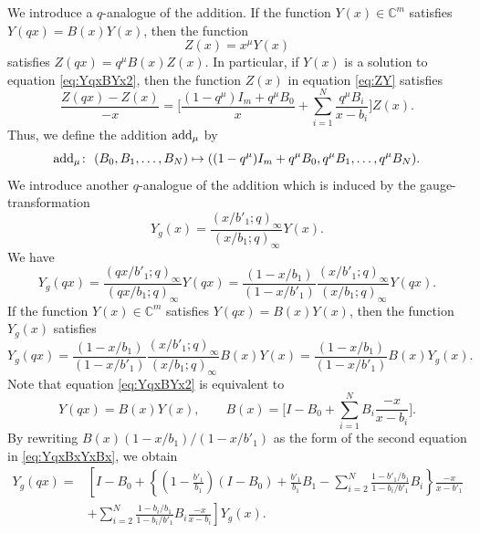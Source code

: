 \documentclass[pdftex]{sigma}
\numberwithin{equation}{section}
\theoremstyle{definition}
\begin{document}
We introduce a $q$-analogue of the addition.
If the function $Y(x) \in \mathbb{C}^m$ satisfies $Y(qx) =B(x)Y(x) $, then the function
\begin{equation}
Z(x)= x^{\mu } Y(x)
\label{eq:ZY}
\end{equation}
satisfies $Z(qx) = q^{\mu } B(x)Z(x) $.
In particular, if $Y(x)$ is a solution to equation \eqref{eq:YqxBYx2}, then the function $Z(x)$ in equation \eqref{eq:ZY} satisfies
\begin{equation*}
\frac{Z(q x) - Z(x )}{-x} = \Biggl[ \frac{(1-q^{\mu} )I_m + q^{\mu }B_0}{x} + \sum^{N}_{i = 1}\frac{q^{\mu } B_{i}}{x -b_{i}} \Biggr] Z(x).
\end{equation*}
Thus, we define the addition ${\rm add}_{\mu } $ by
\[
{\rm add}_{\mu }\colon \ (B_0, B_1, \ldots, B_N) \mapsto ((1-q^{\mu} )I_m + q^{\mu }B_0 , q^{\mu }B_1, \ldots, q^{\mu }B_N).
\]
We introduce another $q$-analogue of the addition which is induced by the gauge-transformation
\begin{equation}
Y_g (x) = \frac{( x/ b'_1;q)_{\infty }}{( x/b_1;q)_{\infty}} Y(x).
\label{eq:anotheradd}
\end{equation}
We have
\begin{equation*}
Y_g (qx) = \frac{( qx/ b'_1;q)_{\infty }}{( qx/b_1;q)_{\infty}} Y(qx) = \frac{(1-x/b_1)}{(1-x/b'_1)} \frac{( x/ b'_1;q)_{\infty }}{( x/b_1;q)_{\infty}} Y(qx).
\end{equation*}
If the function $Y(x) \in \mathbb{C}^m$ satisfies $Y(qx) =B(x)Y(x) $, then the function $Y_g (x)$ satisfies
\begin{equation*}
Y_g (qx)
= \frac{(1-x/b_1)}{(1-x/b'_1)} \frac{( x/ b'_1;q)_{\infty }}{( x/b_1;q)_{\infty}} B(x) Y(x) = \frac{(1-x/b_1)}{(1-x/b'_1)} B(x) Y_g (x).
\end{equation*}
Note that equation \eqref{eq:YqxBYx2} is equivalent to
\begin{equation}
Y(q x) = B(x) Y(x) , \qquad B(x)= \Biggl[ I -B_{0} + \sum^{N}_{i = 1} B_{i} \frac{-x }{x -b_{i}} \Biggr].
\label{eq:YqxBxYxBx}
\end{equation}
By rewriting $B(x) (1-x/b_1)/(1-x/b'_1) $ as the form of the second equation in \eqref{eq:YqxBxYxBx}, we obtain
\begin{align*}
Y_g (qx) ={}& \left[ I -B_{0} + \left\{ \left(1- \frac{b'_1 }{b_1} \right) ( I - B_{0} ) + \frac{b'_1}{b_1} B_{1} - \sum^{N}_{i = 2} \frac{1 - b'_1 / b_1 }{ 1 - b_i/ b'_1 } B_{i} \right\} \frac{-x }{x -b'_1} \right.\\
&\left.+ \sum^{N}_{i = 2} \frac{1 - b_i /b_1}{1 - b_i /b'_1 } B_{i} \frac{-x }{x -b_{i}} \right] Y_g (x).
\end{align*}
\end{document}
